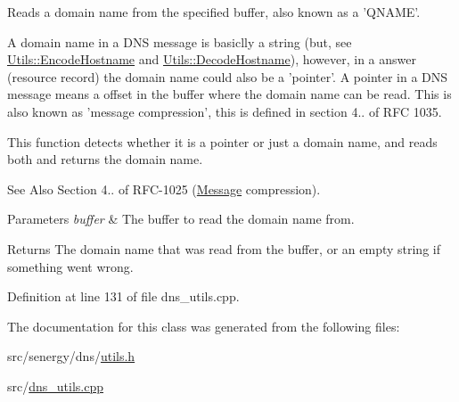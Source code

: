 Reads a domain name from the specified buffer, also known as a 'Q\-N\-A\-M\-E'. 

A domain name in a D\-N\-S message is basiclly a string (but, see \hyperlink{class_senergy_1_1_dns_1_1_utils_a68f1ebf9810ecb225a4f73c4200778bf}{Utils\-::\-Encode\-Hostname} and \hyperlink{class_senergy_1_1_dns_1_1_utils_ad621e66ca0463aaa21c9b74b489f09f3}{Utils\-::\-Decode\-Hostname}), however, in a answer (resource record) the domain name could also be a 'pointer'. A pointer in a D\-N\-S message means a offset in the buffer where the domain name can be read. This is also known as 'message compression', this is defined in section 4.. of R\-F\-C 1035.

This function detects whether it is a pointer or just a domain name, and reads both and returns the domain name.

\begin{DoxySeeAlso}{See Also}
Section 4.. of R\-F\-C-\/1025 (\hyperlink{class_senergy_1_1_dns_1_1_message}{Message} compression).
\end{DoxySeeAlso}

\begin{DoxyParams}{Parameters}
{\em buffer} & The buffer to read the domain name from.\\
\hline
\end{DoxyParams}
\begin{DoxyReturn}{Returns}
The domain name that was read from the buffer, or an empty string if something went wrong. 
\end{DoxyReturn}


Definition at line 131 of file dns\-\_\-utils.\-cpp.



The documentation for this class was generated from the following files\-:\begin{DoxyCompactItemize}
\item 
src/senergy/dns/\hyperlink{utils_8h}{utils.\-h}\item 
src/\hyperlink{dns__utils_8cpp}{dns\-\_\-utils.\-cpp}\end{DoxyCompactItemize}
